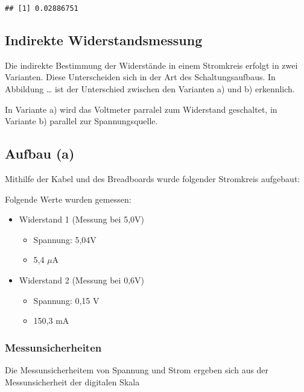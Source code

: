 \documentclass[
  9pt,
]{article}
\begin{document}
\begin{verbatim}
## [1] 0.02886751
\end{verbatim}

\hypertarget{indirekte-widerstandsmessung}{%
\subsection{Indirekte
Widerstandsmessung}\label{indirekte-widerstandsmessung}}

Die indirekte Bestimmung der Widerstände in einem Stromkreis erfolgt in
zwei Varianten. Diese Unterscheiden sich in der Art des
Schaltungsaufbaus. In Abbildung \ldots{} ist der Unterschied zwischen
den Varianten a) und b) erkennlich.

In Variante a) wird das Voltmeter parralel zum Widerstand geschaltet, in
Variante b) parallel zur Spannungsquelle.

\hypertarget{aufbau-a}{%
\subsection{Aufbau (a)}\label{aufbau-a}}

Mithilfe der Kabel und des Breadboards wurde folgender Stromkreis
aufgebaut:

Folgende Werte wurden gemessen:

\begin{itemize}
\item {Widerstand 1 (Messung bei 5,0V)}
\begin{itemize}
\item {Spannung: 5,04V}
\item {5,4 $\mu$A}
\end{itemize}
\item {Widerstand 2 (Messung bei 0,6V)}
\begin{itemize}
\item {Spannung: 0,15 V}
\item {150,3 mA}
\end{itemize}
\end{itemize}

\hypertarget{messunsicherheiten}{%
\subsubsection{Messunsicherheiten}\label{messunsicherheiten}}

Die Messunsicherheitem von Spannung und Strom ergeben sich aus der
Messunsicherheit der digitalen Skala
\end{document}
